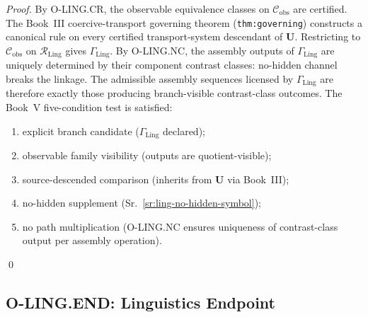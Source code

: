 \documentclass[12pt,oneside]{amsbook}
\theoremstyle{plain}
\theoremstyle{definition}
\theoremstyle{remark}
\begin{document}
\begin{proof}
By O-LING.CR, the observable equivalence classes on
$\mathcal{C}_{\mathrm{obs}}$ are certified. The Book~III
coercive-transport governing theorem (\texttt{thm:governing}) constructs
a canonical rule on every certified transport-system descendant of
$\mathbf{U}$. Restricting to $\mathcal{C}_{\mathrm{obs}}$ on
$\mathcal{R}_{\mathrm{Ling}}$ gives $\Gamma_{\mathrm{Ling}}$. By
O-LING.NC, the assembly outputs of $\Gamma_{\mathrm{Ling}}$ are
uniquely determined by their component contrast classes: no-hidden
channel breaks the linkage. The admissible assembly sequences
licensed by $\Gamma_{\mathrm{Ling}}$ are therefore exactly those
producing branch-visible contrast-class outcomes. The Book~V
five-condition test is satisfied:
\begin{enumerate}[label=\textup{(\roman*)}]
 \item explicit branch candidate ($\Gamma_{\mathrm{Ling}}$ declared);
 \item observable family visibility (outputs are quotient-visible);
 \item source-descended comparison (inherits from $\mathbf{U}$ via
 Book~III);
 \item no-hidden supplement (Sr.~\ref{sr:ling-no-hidden-symbol});
 \item no path multiplication (O-LING.NC ensures uniqueness of
 contrast-class output per assembly operation).
\end{enumerate}
\qed
\end{proof}

\subsection{O-LING.END: Linguistics Endpoint}\label{sec:ling-END-discharge}
\end{document}
